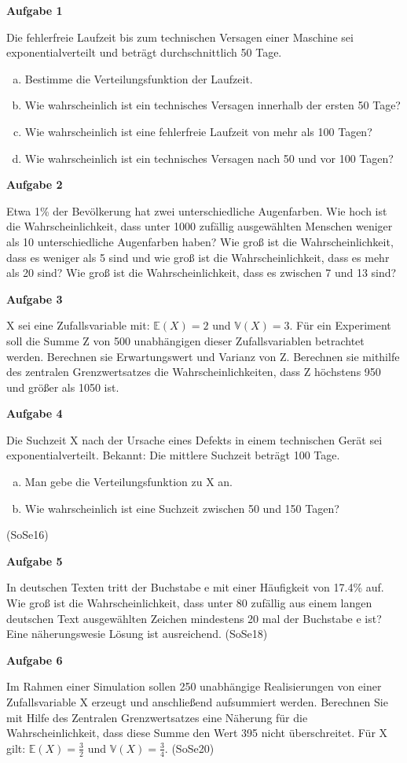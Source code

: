 \documentclass[a4paper,12pt]{article}
\newcommand{\Aufgabe}[1]{
  {
  \vspace*{0.5cm}
  \textsf{\textbf{Aufgabe #1}}
  \vspace*{0.2cm}
  
  }
}
\begin{document}
\Aufgabe{1}
Die fehlerfreie Laufzeit bis zum technischen Versagen einer Maschine sei exponentialverteilt und beträgt durchschnittlich 50 Tage.
\begin{enumerate}[a)]
\item Bestimme die Verteilungsfunktion der Laufzeit.
\item Wie wahrscheinlich ist ein technisches Versagen innerhalb der ersten 50 Tage?
\item Wie wahrscheinlich ist eine fehlerfreie Laufzeit von mehr als 100 Tagen?
\item Wie wahrscheinlich ist ein technisches Versagen nach 50 und vor 100 Tagen?
\end{enumerate} 

\Aufgabe{2}
Etwa 1\% der Bevölkerung hat zwei unterschiedliche Augenfarben. Wie hoch ist die Wahrscheinlichkeit, dass unter 1000 zufällig ausgewählten Menschen weniger als 10 unterschiedliche Augenfarben haben? Wie groß ist die Wahrscheinlichkeit, dass es weniger als 5 sind und wie groß ist die Wahrscheinlichkeit, dass es mehr als 20 sind? Wie groß ist die Wahrscheinlichkeit, dass es zwischen 7 und 13 sind?
 
\Aufgabe{3}
X sei eine Zufallsvariable mit: $ \mathbb{E}(X)= 2$ und $ \mathbb{V}(X)=3 $. Für ein Experiment soll die Summe Z von 500 unabhängigen dieser Zufallsvariablen betrachtet werden.
Berechnen sie Erwartungswert und Varianz von Z. Berechnen sie mithilfe des zentralen Grenzwertsatzes die Wahrscheinlichkeiten, dass Z höchstens 950 und größer als 1050 ist. 

\Aufgabe{4}
Die Suchzeit X nach der Ursache eines Defekts in einem technischen Gerät sei exponentialverteilt. Bekannt: Die mittlere Suchzeit beträgt 100 Tage.
\begin{enumerate}[a)]
\item Man gebe die Verteilungsfunktion zu X an.
\item Wie wahrscheinlich ist eine Suchzeit zwischen 50 und 150 Tagen?
\end{enumerate} (SoSe16) 



\Aufgabe{5}
In deutschen Texten tritt der Buchstabe e mit einer Häufigkeit von 17.4\% auf. Wie groß ist die Wahrscheinlichkeit, dass unter 80 zufällig aus einem langen deutschen Text ausgewählten Zeichen mindestens 20 mal der Buchstabe e ist? Eine näherungswesie Lösung ist ausreichend. (SoSe18)

\Aufgabe{6}
Im Rahmen einer Simulation sollen 250 unabhängige Realisierungen von einer Zufallsvariable X erzeugt und anschließend aufsummiert werden. Berechnen Sie mit Hilfe des Zentralen Grenzwertsatzes eine Näherung für die Wahrscheinlichkeit, dass diese Summe den Wert 395 nicht überschreitet. Für X gilt: $ \mathbb{E}(X)= \frac{3}{2}$ und $ \mathbb{V}(X)=\frac{3}{4} $. (SoSe20)
\end{document}
